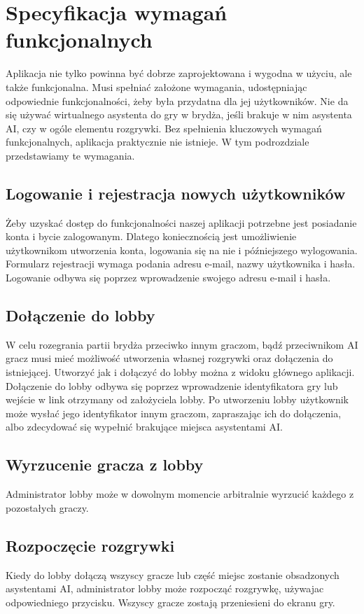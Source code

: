 


\section{Specyfikacja wymagań funkcjonalnych}
Aplikacja nie tylko powinna być dobrze zaprojektowana i wygodna w użyciu, ale także funkcjonalna. Musi spełniać założone wymagania, udostępniając odpowiednie funkcjonalności, żeby była przydatna dla jej użytkowników. Nie da się używać wirtualnego asystenta do gry w brydża, jeśli brakuje w nim asystenta AI, czy w ogóle elementu rozgrywki. Bez spełnienia kluczowych wymagań funkcjonalnych, aplikacja praktycznie nie istnieje. W tym podrozdziale przedstawiamy te wymagania.
\subsection{Logowanie i rejestracja nowych użytkowników}
Żeby uzyskać dostęp do funkcjonalności naszej aplikacji potrzebne jest posiadanie konta i bycie zalogowanym. Dlatego koniecznością jest umożliwienie użytkownikom utworzenia konta, logowania się na nie i późniejszego wylogowania. Formularz rejestracji wymaga podania adresu e-mail, nazwy użytkownika i hasła. Logowanie odbywa się poprzez wprowadzenie swojego adresu e-mail i hasła.
\subsection{Dołączenie do lobby}
W celu rozegrania partii brydża przeciwko innym graczom, bądź przeciwnikom AI gracz musi mieć możliwość utworzenia własnej rozgrywki oraz dołączenia do istniejącej. Utworzyć jak i dołączyć do lobby można z widoku głównego aplikacji.  Dołączenie do lobby odbywa się poprzez wprowadzenie identyfikatora gry lub wejście w link otrzymany od założyciela lobby. Po utworzeniu lobby użytkownik może wysłać jego identyfikator innym graczom, zapraszając ich do dołączenia, albo zdecydować się wypełnić brakujące miejsca asystentami AI. 
\subsection{Wyrzucenie gracza z lobby}
Administrator lobby może w dowolnym momencie arbitralnie wyrzucić każdego z pozostałych graczy.
\subsection{Rozpoczęcie rozgrywki}
Kiedy do lobby dołączą wszyscy gracze lub część miejsc zostanie obsadzonych asystentami AI, administrator lobby może rozpocząć rozgrywkę, używajac odpowiedniego przycisku. Wszyscy gracze zostają przeniesieni do ekranu gry. 

